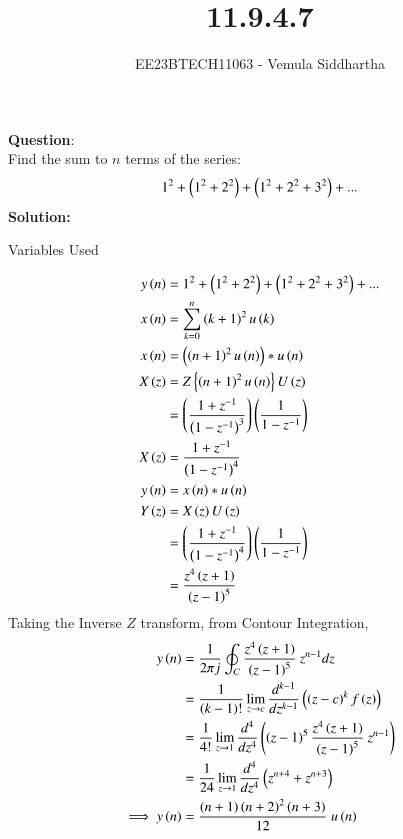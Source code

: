 \documentclass[journal,12pt,twocolumn]{IEEEtran}
\theoremstyle{remark}
\begin{document}

\vspace{3cm}

\title{11.9.4.7}
\author{EE23BTECH11063 - Vemula Siddhartha
}
\maketitle
\newpage
\bigskip

\renewcommand{\thefigure}{\theenumi}
\renewcommand{\thetable}{\theenumi}
\textbf{Question}:\\
Find the sum to $n$ terms of the series:
\begin{align*}
    1^2+\left(1^2+2^2\right)+\left(1^2+2^2+3^2\right)+...
\end{align*}
\textbf{Solution:}
\begin{table}[h!]    
    \centering
    
    \caption{Variables Used}
    \label{tab10.5.3.9.1}
  \end{table}
\begin{align}
    y\left(n\right)&=1^2+\left(1^2+2^2\right)+\left(1^2+2^2+3^2\right)+...\\
    x\left(n\right)&=\sum_{k=0}^{n}\left(k+1\right)^2u\left(k\right)\\
    x\left(n\right)&=\left(\left(n+1\right)^2u\left(n\right)\right)*u\left(n\right)\\
    X\left(z\right)&=Z\left\{\left(n+1\right)^2u\left(n\right)\right\}U\left(z\right)\\
    &=\left(\frac{1+z^{-1}}{\left(1-z^{-1}\right)^3}\right)\left(\frac{1}{1-z^{-1}}\right)\\
    X\left(z\right)&=\frac{1+z^{-1}}{\left(1-z^{-1}\right)^4}\\
    y\left(n\right)&=x\left(n\right)*u\left(n\right)\\
    Y\left(z\right)&=X\left(z\right)U\left(z\right)\\
    &=\left(\frac{1+z^{-1}}{\left(1-z^{-1}\right)^4}\right)\left(\frac{1}{1-z^{-1}}\right)\\
    &=\frac{z^4\left(z+1\right)}{\left(z-1\right)^5}
\end{align}
Taking the Inverse $Z$ transform, from Contour Integration,
\begin{align}
    y\left(n\right)&=\frac{1}{2\pi j}\oint_C\frac{z^4\left(z+1\right)}{\left(z-1\right)^5}\:z^{n-1}dz\\
    &=\frac{1}{\left(k-1\right)!} \lim_{z\to c}\frac{d^{k-1}}{dz^{k-1}}\left(\left(z-c\right)^kf\left(z\right)\right)\\
    &=\frac{1}{4!}\lim_{z\to1}\frac{d^4}{dz^4}\left(\left(z-1\right)^5\frac{z^4\left(z+1\right)}{\left(z-1\right)^5}\:z^{n-1}\right)\\
    &=\frac{1}{24}\lim_{z\to1}\frac{d^4}{dz^4}\left(z^{n+4}+z^{n+3}\right)\\
    \implies y\left(n\right)&=\frac{\left(n+1\right)\left(n+2\right)^2\left(n+3\right)}{12}\;u\left(n\right)
\end{align}
\end{document}

